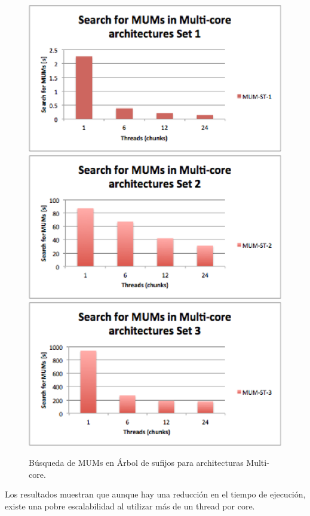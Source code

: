 \documentclass[12pt,a4paper]{article}
\begin{document}
  \begin{figure}[h] 
   \centering 
   \includegraphics[scale=0.5]{st1.eps} 
   \includegraphics[scale=0.5]{st2.eps} 
   \includegraphics[scale=0.5]{st3.eps} 
  \caption{Búsqueda de MUMs en Árbol de sufijos para architecturas Multi-core.} 
   \label{fig:stmc} 
 \end{figure}
Los resultados muestran que aunque hay una reducción en el tiempo de ejecución, existe una pobre escalabilidad al utilizar más de un thread por core.
\end{document}
